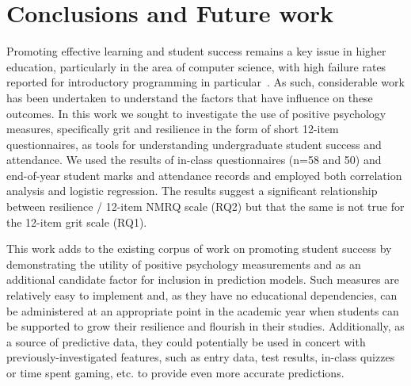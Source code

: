 \documentclass[sigconf]{acmart}
\begin{document}
\section{Conclusions and Future work}
Promoting effective learning and student success remains a key issue in higher education, particularly in the area of computer science, with high failure rates reported for introductory programming in particular~\cite{Watson:2014:FRI:2591708.2591749,Bennedsen2019}. As such, considerable work has been undertaken to understand the factors that have influence on these outcomes. In this work we sought to investigate the use of positive psychology measures, specifically grit and resilience in the form of short 12-item questionnaires, as tools for understanding undergraduate student success and attendance. We used the results of in-class questionnaires (n=58 and 50) and end-of-year student marks and attendance records and employed both correlation analysis and logistic regression. The results suggest a significant relationship between resilience / 12-item NMRQ scale (RQ2) but that the same is not true for the 12-item grit scale (RQ1).

This work adds to the existing corpus of work on promoting student success by demonstrating the utility of positive psychology measurements and as an additional candidate factor for inclusion in prediction models. Such measures are relatively easy to implement and, as they have no educational dependencies, can be administered at an appropriate point in the academic year when students can be supported to grow their resilience and flourish in their studies. Additionally, as a source of predictive data, they could potentially be used in concert with previously-investigated features, such as entry data, test results,  in-class quizzes or time spent gaming, etc. to provide even more accurate predictions. 
\end{document}
